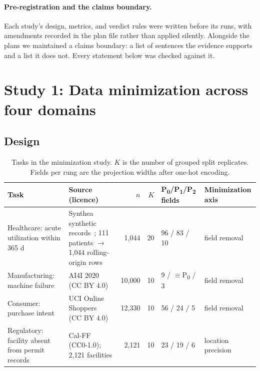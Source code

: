 \documentclass[11pt]{article}
\newcommand{\pz}{P\textsubscript{0}}
\newcommand{\po}{P\textsubscript{1}}
\newcommand{\pt}{P\textsubscript{2}}
\begin{document}
\paragraph{Pre-registration and the claims boundary.} Each study's design, metrics, and verdict rules were written before its runs, with amendments recorded in the plan file rather than applied silently. Alongside the plans we maintained a claims boundary: a list of sentences the evidence supports and a list it does not. Every statement below was checked against it.

\section{Study 1: Data minimization across four domains}
\label{sec:study1}

\subsection{Design}

\begin{table}[t]
\centering\small
\caption{Tasks in the minimization study. $K$ is the number of grouped split replicates. Fields per rung are the projection widths after one-hot encoding.}
\label{tab:tasks}
\begin{tabular}{@{}p{3.6cm}p{5.2cm}rrp{2.1cm}p{2.0cm}@{}}
\toprule
Task & Source (licence) & $n$ & $K$ & \pz/\po/\pt{} fields & Minimization axis \\
\midrule
Healthcare: acute utilization within 365 d & Synthea synthetic records~\citep{synthea}; 111 patients $\to$ 1{,}044 rolling-origin rows & 1{,}044 & 20 & 96 / 83 / 10 & field removal \\
Manufacturing: machine failure & AI4I 2020~\citep{ai4i} (CC BY 4.0) & 10{,}000 & 10 & 9 / $\equiv$\pz{} / 3 & field removal \\
Consumer: purchase intent & UCI Online Shoppers~\citep{shoppers} (CC BY 4.0) & 12{,}330 & 10 & 56 / 24 / 5 & field removal \\
Regulatory: facility absent from permit records & Cal-FF~\citep{calff} (CC0-1.0); 2{,}121 facilities & 2{,}121 & 10 & 23 / 19 / 6 & location precision \\
\bottomrule
\end{tabular}
\end{table}
\end{document}
